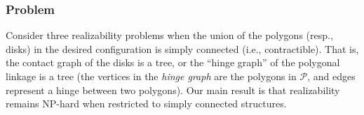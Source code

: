 \documentclass{beamer}
\newtheorem{thm}{Theorem}
\renewcommand{\PP}{{\mathcal{P}}} %
\begin{document}

 \begin{frame}
  \frametitle{Problem}
Consider three realizability problems when the union of the polygons 
(resp., disks) in the desired configuration is simply connected (i.e., contractible). That is, the 
contact graph of the disks is a tree, or the ``hinge graph'' of the polygonal linkage is a tree (the 
vertices in the \emph{hinge graph} are the polygons in $\PP$, and edges represent a hinge between 
two polygons). Our main result is that realizability remains NP-hard when restricted to simply 
connected structures.
\end{frame}

\end{document}

